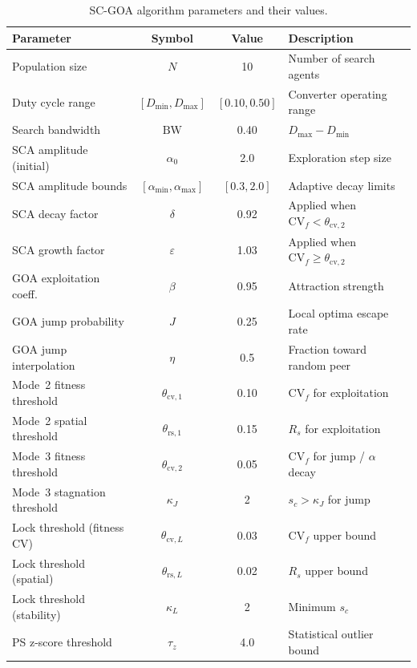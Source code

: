 \documentclass[a4paper, 12pt]{article}
\begin{document}
\begin{table}[htbp]
\centering
\caption{SC-GOA algorithm parameters and their values.}
\label{tab:params}
\renewcommand{\arraystretch}{1.3}
\small
\begin{tabular}{@{} l c c l @{}}
\toprule
\textbf{Parameter} & \textbf{Symbol} & \textbf{Value} & \textbf{Description} \\
\midrule
Population size & $N$ & 10 & Number of search agents \\
Duty cycle range & $[D_{\min}, D_{\max}]$ & $[0.10, 0.50]$ & Converter operating range \\
Search bandwidth & $\mathrm{BW}$ & 0.40 & $D_{\max} - D_{\min}$ \\
\midrule
SCA amplitude (initial) & $\alpha_0$ & 2.0 & Exploration step size \\
SCA amplitude bounds & $[\alpha_{\min}, \alpha_{\max}]$ & $[0.3, 2.0]$ & Adaptive decay limits \\
SCA decay factor & $\delta$ & 0.92 & Applied when $\mathrm{CV}_f < \theta_{\mathrm{cv},2}$ \\
SCA growth factor & $\varepsilon$ & 1.03 & Applied when $\mathrm{CV}_f \geq \theta_{\mathrm{cv},2}$ \\
\midrule
GOA exploitation coeff. & $\beta$ & 0.95 & Attraction strength \\
GOA jump probability & $J$ & 0.25 & Local optima escape rate \\
GOA jump interpolation & $\eta$ & 0.5 & Fraction toward random peer \\
\midrule
Mode~2 fitness threshold & $\theta_{\mathrm{cv},1}$ & 0.10 & $\mathrm{CV}_f$ for exploitation \\
Mode~2 spatial threshold & $\theta_{\mathrm{rs},1}$ & 0.15 & $R_s$ for exploitation \\
Mode~3 fitness threshold & $\theta_{\mathrm{cv},2}$ & 0.05 & $\mathrm{CV}_f$ for jump / $\alpha$ decay \\
Mode~3 stagnation threshold & $\kappa_J$ & 2 & $s_c > \kappa_J$ for jump \\
\midrule
Lock threshold (fitness CV) & $\theta_{\mathrm{cv},L}$ & 0.03 & $\mathrm{CV}_f$ upper bound \\
Lock threshold (spatial) & $\theta_{\mathrm{rs},L}$ & 0.02 & $R_s$ upper bound \\
Lock threshold (stability) & $\kappa_L$ & 2 & Minimum $s_c$ \\
\midrule
PS z-score threshold & $\tau_z$ & 4.0 & Statistical outlier bound \\

\end{tabular}
\end{table}
\end{document}
